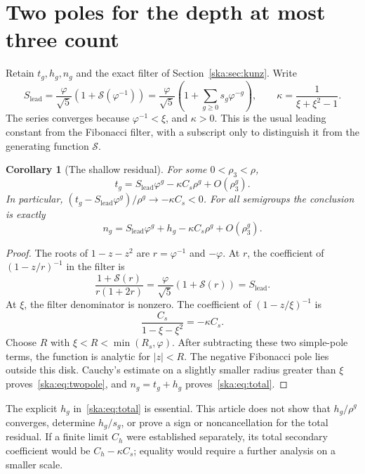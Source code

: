 \documentclass[11pt,letterpaper]{article}
\newtheorem{corollary}[theorem]{Corollary}
\theoremstyle{definition}
\newcommand{\cS}{\mathcal S}\newcommand{\cU}{\mathcal U}
\begin{document}
\section{Two poles for the depth at most three count}\label{ska:sec:twopole}
Retain $t_g,h_g,n_g$ and the exact filter of Section~\ref{ska:sec:kunz}. Write
\begin{equation}\label{ska:eq:Slead}
S_{\mathrm{lead}}=\frac{\varphi}{\sqrt5}
\left(1+\cS(\varphi^{-1})\right)
=\frac{\varphi}{\sqrt5}\left(1+\sum_{g\ge0}s_g\varphi^{-g}\right),
\qquad
\kappa=\frac1{\xi+\xi^2-1}.
\end{equation}
The series converges because $\varphi^{-1}<\xi$, and $\kappa>0$. This is the usual leading constant from the Fibonacci filter, with a subscript only to distinguish it from the generating function $\cS$.

\begin{corollary}[The shallow residual]\label{ska:cor:twopole}
For some $0<\rho_3<\rho$,
\begin{equation}\label{ska:eq:twopole}
t_g=S_{\mathrm{lead}}\varphi^g-\kappa C_s\rho^g+O(\rho_3^g).
\end{equation}
In particular, $(t_g-S_{\mathrm{lead}}\varphi^g)/\rho^g\to-\kappa C_s<0$. For all semigroups the conclusion is exactly
\begin{equation}\label{ska:eq:total}
n_g=S_{\mathrm{lead}}\varphi^g+h_g-\kappa C_s\rho^g+O(\rho_3^g).
\end{equation}
\end{corollary}
\begin{proof}
The roots of $1-z-z^2$ are $r=\varphi^{-1}$ and $-\varphi$. At $r$, the coefficient of $(1-z/r)^{-1}$ in the filter is
\[
\frac{1+\cS(r)}{r(1+2r)}
=\frac{\varphi}{\sqrt5}(1+\cS(r))=S_{\mathrm{lead}}.
\]
At $\xi$, the filter denominator is nonzero. The coefficient of $(1-z/\xi)^{-1}$ is
\[
\frac{C_s}{1-\xi-\xi^2}=-\kappa C_s.
\]
Choose $R$ with $\xi<R<\min(R_s,\varphi)$. After subtracting these two simple-pole terms, the function is analytic for $|z|<R$. The negative Fibonacci pole lies outside this disk. Cauchy's estimate on a slightly smaller radius greater than $\xi$ proves~\eqref{ska:eq:twopole}, and $n_g=t_g+h_g$ proves~\eqref{ska:eq:total}.
\end{proof}

The explicit $h_g$ in~\eqref{ska:eq:total} is essential. This article does not show that $h_g/\rho^g$ converges, determine $h_g/s_g$, or prove a sign or noncancellation for the total residual. If a finite limit $C_h$ were established separately, its total secondary coefficient would be $C_h-\kappa C_s$; equality would require a further analysis on a smaller scale.
\end{document}
